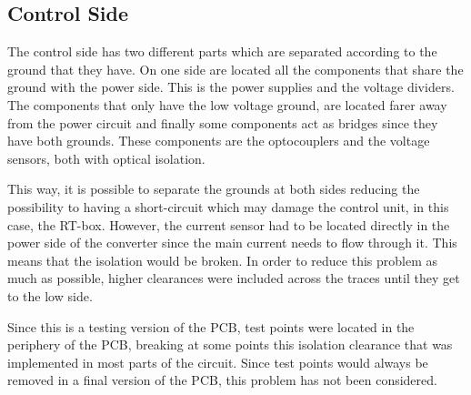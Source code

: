 \subsection{Control Side} \label{PCB_Control}
The control side has two different parts which are separated according to the ground that they have. On one side are located all the components that share the ground with the power side. This is the power supplies and the voltage dividers. The components that only have the low voltage ground, are located farer away from the power circuit and finally some components act as bridges since they have both grounds. These components are the optocouplers and the voltage sensors, both with optical isolation.
 
This way, it is possible to separate the grounds at both sides reducing the possibility to having a short-circuit which may damage the control unit, in this case, the RT-box. However, the current sensor had to be located directly in the power side of the converter since the main current needs to flow through it. This means that the isolation would be broken. In order to reduce this problem as much as possible, higher clearances were included across the traces until they get to the low side.

Since this is a testing version of the PCB, test points were located in the periphery of the PCB, breaking at some points this isolation clearance that was implemented in most parts of the circuit. Since test points would always be removed in a final version of the PCB, this problem has not been considered.
